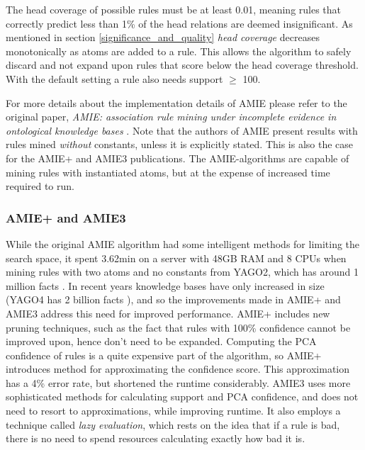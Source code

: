 The head coverage of possible rules must be at least 0.01, meaning rules that correctly predict less than 1\% of the head relations are deemed insignificant. As mentioned in section \ref{significance_and_quality} \textit{head coverage} decreases monotonically as atoms are added to a rule. This allows the algorithm to safely discard and not expand upon rules that score below the head coverage threshold. With the default setting a rule also needs support $\geq$ 100. %

For more details about the implementation details of AMIE please refer to the original paper, \textit{AMIE: association rule mining under incomplete evidence in ontological knowledge bases} \cite{amie_plus}. Note that the authors of AMIE present results with rules mined \textit{without} constants, unless it is explicitly stated. This is also the case for the AMIE+ and AMIE3 publications. The AMIE-algorithms are capable of mining rules with instantiated atoms, but at the expense of increased time required to run.

\subsubsection{AMIE+ and AMIE3}
While the original AMIE algorithm had some intelligent methods for limiting the search space, it spent 3.62min on a server with 48GB RAM and 8 CPUs \cite{amie} when mining rules with two atoms and no constants from YAGO2, which has around 1 million facts \cite{yago2}. In recent years knowledge bases have only increased in size (YAGO4 has 2 billion facts \cite{yago4}), and so the improvements made in AMIE+ and AMIE3 address this need for improved performance. AMIE+ includes new pruning techniques, such as the fact that rules with 100\% confidence cannot be improved upon, hence don't need to be expanded. Computing the PCA confidence of rules is a quite expensive part of the algorithm, so AMIE+ introduces method for approximating the confidence score. This approximation has a 4\% error rate, but shortened the runtime considerably. AMIE3 uses more sophisticated methods for calculating support and PCA confidence, and does not need to resort to approximations, while improving runtime. It also employs a technique called \textit{lazy evaluation}, which rests on the idea that if a rule is bad, there is no need to spend resources calculating exactly how bad it is. 

